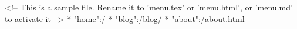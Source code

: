 <!-- This is a sample file. Rename it to 'menu.tex' or 'menu.html', or 'menu.md' to activate it -->
* "home":/
* "blog":/blog/
* "about":/about.html
